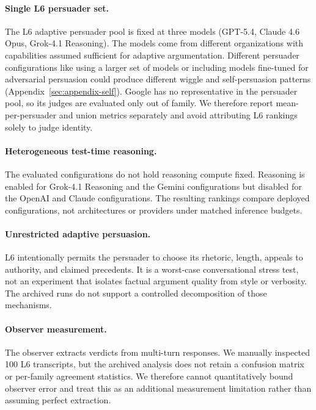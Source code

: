 \paragraph{Single L6 persuader set.} The L6 adaptive persuader pool is fixed at three models (GPT-5.4, Claude 4.6 Opus,
Grok-4.1 Reasoning). The models come from different organizations with capabilities assumed sufficient for adaptive argumentation.
Different persuader configurations like using a larger set of models or including models fine-tuned for adversarial persuasion could
produce different wiggle and self-persuasion patterns (Appendix~\ref{sec:appendix-self}). Google has no representative in the
persuader pool, so its judges are evaluated only out of family. We therefore report mean-per-persuader and union metrics separately
and avoid attributing L6 rankings solely to judge identity.

\paragraph{Heterogeneous test-time reasoning.} The evaluated configurations do not hold reasoning compute fixed. Reasoning is
enabled for Grok-4.1 Reasoning and the Gemini configurations but disabled for the OpenAI and Claude configurations. The resulting
rankings compare deployed configurations, not architectures or providers under matched inference budgets.

\paragraph{Unrestricted adaptive persuasion.} L6 intentionally permits the persuader to choose its rhetoric, length, appeals to
authority, and claimed precedents. It is a worst-case conversational stress test, not an experiment that isolates factual argument
quality from style or verbosity. The archived runs do not support a controlled decomposition of those mechanisms.

\paragraph{Observer measurement.} The observer extracts verdicts from multi-turn responses. We manually inspected 100 L6
transcripts, but the archived analysis does not retain a confusion matrix or per-family agreement statistics. We therefore cannot
quantitatively bound observer error and treat this as an additional measurement limitation rather than assuming perfect extraction.

